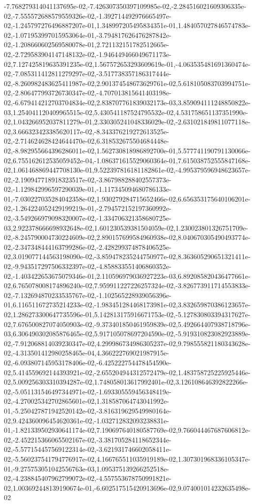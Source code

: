 -7.768279314041137695e-02,-7.426307350397109985e-02,-2.284516021609306335e-02,-7.555572688579559326e-02,-1.392714492976665497e-02,-1.245797276496887207e-01,1.348997205495834351e-01,1.484057027846574783e-02,-1.071953997015953064e-01,-3.794817626476287842e-02,-1.208660602569580078e-01,2.721132151782512665e-02,-2.729583904147148132e-02,-1.946449466049671173e-02,7.127425819635391235e-02,1.567572653293609619e-01,-4.063535481691360474e-02,-7.085311412811279297e-02,-3.517738357186317444e-02,-8.260982483625411987e-02,2.901374548673629761e-02,5.618105083703994751e-02,-2.806477993726730347e-02,-4.707013815641403198e-02,-6.679414212703704834e-02,2.838707761839032173e-03,3.859094111248850822e-03,1.254041120409965515e-02,5.430541187524795532e-02,4.531758651137351990e-02,1.043266952037811279e-01,2.330305241048336029e-02,-2.631021849811077118e-02,3.666323423385620117e-02,-8.343376219272613525e-02,-2.714624628424644470e-02,6.318532675504684448e-02,-8.982955664396286011e-02,1.562730818986892700e-01,5.577741190791130066e-02,6.755162612535059452e-04,-1.086371615529060364e-01,7.615038752555847168e-02,1.061468869447708130e-01,9.522397816181182861e-02,-4.995379596948623657e-02,-2.190947718918323517e-02,-3.867988288402557373e-02,-1.129842996597290039e-01,-1.117345094680786133e-01,-7.030227035284042358e-02,1.930279284715652466e-02,6.656353175640106201e-02,-1.264224052429199219e-01,-2.794572152197360992e-02,-3.549266979098320007e-02,-1.334706321358680725e-03,2.922378666698932648e-02,1.601230539381504059e-02,1.230023801326751709e-02,-8.245790004730224609e-02,2.890157699584960938e-02,8.040670305490493774e-02,-2.347348444163799286e-02,-2.428299374878406525e-02,3.019077144563198090e-02,-3.859478235244750977e-02,8.363605290651321411e-02,-9.943517297506332397e-02,-4.858833551406860352e-02,-1.403422653675079346e-01,2.110596979036927223e-03,6.892085820436477661e-02,6.765078008174896240e-02,7.959911227226257324e-02,-3.826773911714553833e-02,-7.132694870233535767e-02,-1.102565228939056396e-01,6.116511672735214233e-02,-1.983451284468173981e-02,3.832659870386123657e-02,1.286273300647735596e-01,5.142813175916671753e-02,-5.127830803394317627e-02,7.676500827074050903e-02,-9.373401850461959839e-02,5.492664407938718796e-03,6.306490302085876465e-02,5.917105078697204590e-02,-5.919310823082923889e-02,-7.912068814039230347e-02,4.299986734986305237e-02,9.798555821180343628e-02,-4.313501412980258465e-04,4.366222769021987915e-02,-6.093807145953178406e-02,-6.425222754478454590e-02,5.414559692144393921e-02,-2.655204944312572479e-02,1.483758725225925446e-02,5.009256303310394287e-02,1.748058013617992401e-02,3.126108646392822266e-02,-5.051131546497344971e-02,-1.693305559456348419e-02,-4.270025342702865601e-02,1.318587064743041992e-01,-5.250427871942520142e-02,-3.816319629549980164e-02,9.424360096454620361e-02,-1.032712832093238831e-01,-1.821339502930641174e-02,7.190697640180587769e-02,9.766044467687606812e-02,-2.452215366065502167e-02,-3.381705284118652344e-02,-5.577154457569122314e-02,-3.621931746602058411e-02,-5.560237541794776917e-02,4.166765511035919189e-02,1.307301968336105347e-01,-9.275753051042556763e-03,1.095375139266252518e-02,-4.238845407962799072e-02,-4.557553678750991821e-02,1.003692448139190674e-01,-6.602517515420913696e-02,9.074001014232635498e-02
